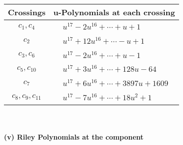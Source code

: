 \documentclass[1p]{elsarticle_modified}
\theoremstyle{definition}
\begin{document}
\begin{tabular}{m{50pt}|m{274pt}}
Crossings & \hspace{64pt}u-Polynomials at each crossing \\
\hline $$\begin{aligned}c_{1},c_{4}\end{aligned}$$&$\begin{aligned}
&u^{17}-2 u^{16}+\cdots+u+1
\end{aligned}$\\
\hline $$\begin{aligned}c_{2}\end{aligned}$$&$\begin{aligned}
&u^{17}+12 u^{16}+\cdots- u+1
\end{aligned}$\\
\hline $$\begin{aligned}c_{3},c_{6}\end{aligned}$$&$\begin{aligned}
&u^{17}-2 u^{16}+\cdots+u-1
\end{aligned}$\\
\hline $$\begin{aligned}c_{5},c_{10}\end{aligned}$$&$\begin{aligned}
&u^{17}+3 u^{16}+\cdots+128 u-64
\end{aligned}$\\
\hline $$\begin{aligned}c_{7}\end{aligned}$$&$\begin{aligned}
&u^{17}+6 u^{16}+\cdots+3897 u+1609
\end{aligned}$\\
\hline $$\begin{aligned}c_{8},c_{9},c_{11}\end{aligned}$$&$\begin{aligned}
&u^{17}-7 u^{16}+\cdots+18 u^2+1
\end{aligned}$\\
\hline
\end{tabular}\\~\\
\newpage\renewcommand{\arraystretch}{1}
\flushleft \textbf{(v) Riley Polynomials at the component}\newline \\
\end{document}

